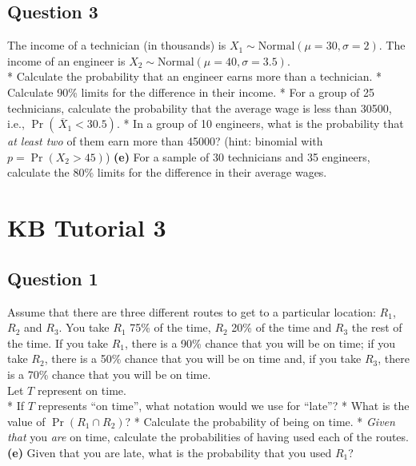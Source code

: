 
\subsection*{Question 3}
The income of a technician (in thousands) is $X_1 \sim \text{Normal}(\mu=30,\sigma=2)$. The income of an engineer is $X_2 \sim \text{Normal}(\mu=40,\sigma=3.5)$. \\[-0.2cm]

*  Calculate the probability that an engineer earns more than a technician. 
 *  Calculate 90\% limits for the difference in their income. 
 *  For a group of 25 technicians, calculate the probability that the average wage is less than 30500, i.e., $\Pr(\,\overline{\!X}_1 < 30.5)$. 
 *  In a group of 10 engineers, what is the probability that \emph{at least two} of them earn more than 45000? (hint: binomial with $p = \Pr(X_2 > 45)$) 
 {\bf(e)} For a sample of 30 technicians and 35 engineers, calculate the 80\% limits for the difference in their average wages.



\section{KB Tutorial 3}
\subsection*{Question 1}
Assume that there are three different routes to get to a particular location: $R_1$, $R_2$ and $R_3$. You take $R_1$ 75\% of the time, $R_2$ 20\% of the time and $R_3$ the rest of the time. If you take $R_1$, there is a 90\% chance that you will be on time; if you take $R_2$, there is a 50\% chance that you will be on time and, if you take $R_3$, there is a 70\% chance that you will be on time. \\[0.1cm]
Let $T$ represent on time.\\[-0.2cm]

*  If $T$ represents ``on time'', what notation would we use for ``late''? 
 *  What is the value of $\Pr(R_1 \cap R_2)$? 
 *  Calculate the probability of being on time. 
 *  \emph{Given that} you \emph{are} on time, calculate the probabilities of having used each of the routes. 
 {\bf(e)} Given that you are late, what is the probability that you used $R_1$?





